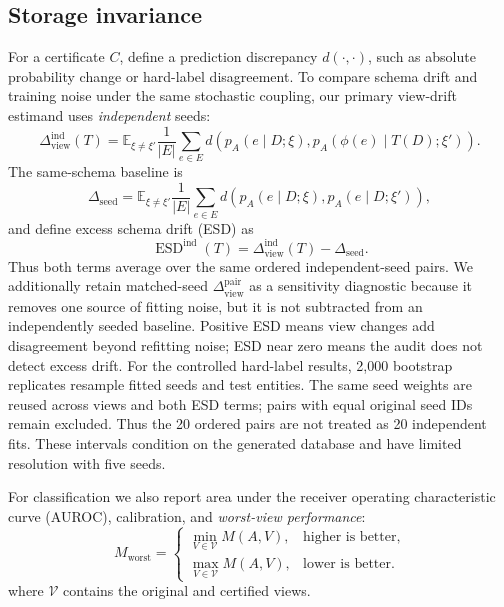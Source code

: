 \documentclass[runningheads]{llncs}
\newcommand{\Dview}{\Delta_{\mathrm{view}}}
\newcommand{\Dseed}{\Delta_{\mathrm{seed}}}
\newcommand{\ESD}{\operatorname{ESD}}
\begin{document}
\subsection{Storage invariance}
For a certificate $C$, define a prediction discrepancy $d(\cdot,\cdot)$, such as absolute probability change or hard-label disagreement. To compare schema drift and training noise under the same stochastic coupling, our primary view-drift estimand uses \emph{independent} seeds:
\begin{equation}
\Dview^{\mathrm{ind}}(T)=\mathbb{E}_{\xi\neq\xi'}\frac{1}{|E|}\sum_{e\in E}
 d\!\left(p_A(e\mid D;\xi),p_A(\phi(e)\mid T(D);\xi')\right).
\end{equation}
The same-schema baseline is
\begin{equation}
\Dseed=\mathbb{E}_{\xi\neq\xi'}\frac{1}{|E|}\sum_{e\in E}
 d\!\left(p_A(e\mid D;\xi),p_A(e\mid D;\xi')\right),
\end{equation}
and define excess schema drift (ESD) as
\begin{equation}
\ESD^{\mathrm{ind}}(T)=\Dview^{\mathrm{ind}}(T)-\Dseed.
\label{eq:esd}
\end{equation}
Thus both terms average over the same ordered independent-seed pairs. We additionally retain matched-seed $\Dview^{\mathrm{pair}}$ as a sensitivity diagnostic because it removes one source of fitting noise, but it is not subtracted from an independently seeded baseline. Positive ESD means view changes add disagreement beyond refitting noise; ESD near zero means the audit does not detect excess drift. For the controlled hard-label results, 2,000 bootstrap replicates resample fitted seeds and test entities. The same seed weights are reused across views and both ESD terms; pairs with equal original seed IDs remain excluded. Thus the 20 ordered pairs are not treated as 20 independent fits. These intervals condition on the generated database and have limited resolution with five seeds.

For classification we also report area under the receiver operating characteristic curve (AUROC), calibration, and \emph{worst-view performance}:
\begin{equation}
M_{\mathrm{worst}}=\begin{cases}
\min_{V\in\mathcal{V}}M(A,V), & \text{higher is better},\\
\max_{V\in\mathcal{V}}M(A,V), & \text{lower is better}.
\end{cases}
\end{equation}
where $\mathcal{V}$ contains the original and certified views.
\end{document}
